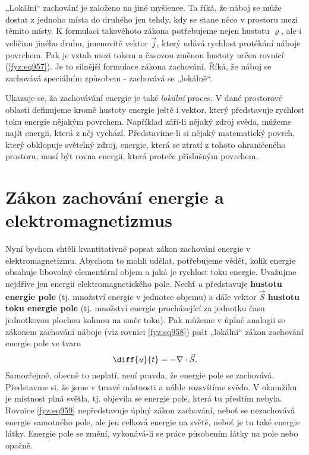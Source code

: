     „Lokální“ zachování je založeno na jiné myšlence. Ta říká, že náboj se může dostat z jednoho
    místa do druhého jen tehdy, kdy se stane něco v prostoru mezi těmito místy. K formulaci
    takovéhoto zákona potřebujeme nejen hustotu \(\varrho\), ale i veličinu jiného druhu, jmenovitě
    vektor \(\vec{j}\), který udává rychlost protékání náboje povrchem. Pak je vztah mezi tokem a
    časovou změnou hustoty určen rovnicí (\ref{fyz:eq957}). Je to silnější formulace zákona
    zachování. Říká, že náboj se zachovává speciálním způsobem - zachovává se „lokálně“.

    Ukazuje se, ža zachovávání energie je také \emph{lokální} proces. V dané prostorové oblasti
    definujeme kromě hustoty energie ještě i vektor, který představuje rychlost toku energie nějakým
    povrchem. Například září-li nějaký zdroj svěda, můžeme najít energii, která z něj vychází.
    Představíme-li si nějaký matematický povrch, který obklopuje světelný zdroj, energie, která se
    ztratí z tohoto ohraničeného prostoru, musí být rovna energii, která proteče příslušným
    povrchem.

  \section{Zákon zachování energie a elektromagnetizmus}\label{fyz:IIchapXXVIIsecII}
    
    Nyní bychom chtěli kvantitativně popsat zákon zachování energie v elektromagnetizmu. Abychom to
    mohli udělat, potřebujeme vědět, kolik energie obsahuje libovolný elementární objem a jaká je
    rychlost toku energie. Uvažujme nejdříve jen energii elektromagnetického pole. Nechť \(u\)
    představuje \textbf{hustotu energie pole} (tj. množství energie v jednotce objemu) a dále vektor
    \(\vec{S}\) \textbf{hustotu toku energie pole} (tj. množství energie procházející za jednotku
    času jednotkovou plochou kolmou na směr toku). Pak můžeme v úplné analogii se zákonem zachování
    náboje (viz rovnici \eqref{fyz:eq958}) psát „lokální“ zákon zachování energie pole ve tvaru
    \begin{equation}\label{fyz:eq959}
      \diff{u}{t}=-\nabla\cdot\vec{S}.
    \end{equation}
    Samozřejmě, obecně to neplatí, není pravda, že energie pole se zachovává. Představme si, že jsme
    v tmavé místnosti a náhle rozsvítíme svědo. V okamžiku je místnost plná světla, tj. objevila se
    energie pole, která tu předtím nebyla. Rovnice \eqref{fyz:eq959} nepředstavuje úplný zákon
    zachování, neboť se nezachovává energie samotného pole, ale jen celková energie na světě, neboť
    je tu také energie látky. Energie pole se změní, vykonává-li se práce působením látky na pole
    nebo opačně.
    
